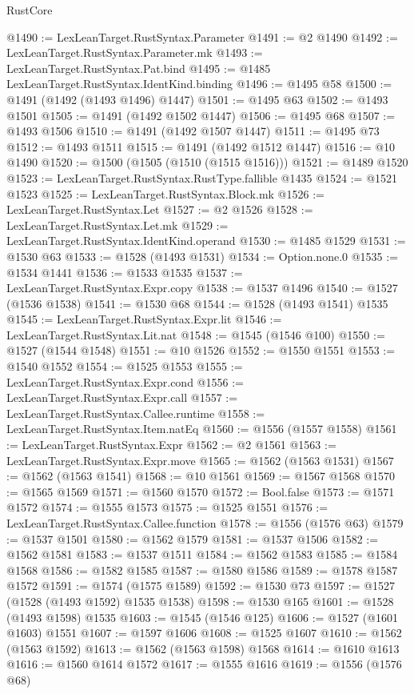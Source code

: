 \begin{lexlean}{RustCore}
\begin{coremodule}
@1490 := LexLeanTarget.RustSyntax.Parameter
@1491 := @2 @1490
@1492 := LexLeanTarget.RustSyntax.Parameter.mk
@1493 := LexLeanTarget.RustSyntax.Pat.bind
@1495 := @1485 LexLeanTarget.RustSyntax.IdentKind.binding
@1496 := @1495 @58
@1500 := @1491 (@1492 (@1493 @1496) @1447)
@1501 := @1495 @63
@1502 := @1493 @1501
@1505 := @1491 (@1492 @1502 @1447)
@1506 := @1495 @68
@1507 := @1493 @1506
@1510 := @1491 (@1492 @1507 @1447)
@1511 := @1495 @73
@1512 := @1493 @1511
@1515 := @1491 (@1492 @1512 @1447)
@1516 := @10 @1490
@1520 := @1500 (@1505 (@1510 (@1515 @1516)))
@1521 := @1489 @1520
@1523 := LexLeanTarget.RustSyntax.RustType.fallible @1435
@1524 := @1521 @1523
@1525 := LexLeanTarget.RustSyntax.Block.mk
@1526 := LexLeanTarget.RustSyntax.Let
@1527 := @2 @1526
@1528 := LexLeanTarget.RustSyntax.Let.mk
@1529 := LexLeanTarget.RustSyntax.IdentKind.operand
@1530 := @1485 @1529
@1531 := @1530 @63
@1533 := @1528 (@1493 @1531)
@1534 := Option.none.{0}
@1535 := @1534 @1441
@1536 := @1533 @1535
@1537 := LexLeanTarget.RustSyntax.Expr.copy
@1538 := @1537 @1496
@1540 := @1527 (@1536 @1538)
@1541 := @1530 @68
@1544 := @1528 (@1493 @1541) @1535
@1545 := LexLeanTarget.RustSyntax.Expr.lit
@1546 := LexLeanTarget.RustSyntax.Lit.nat
@1548 := @1545 (@1546 @100)
@1550 := @1527 (@1544 @1548)
@1551 := @10 @1526
@1552 := @1550 @1551
@1553 := @1540 @1552
@1554 := @1525 @1553
@1555 := LexLeanTarget.RustSyntax.Expr.cond
@1556 := LexLeanTarget.RustSyntax.Expr.call
@1557 := LexLeanTarget.RustSyntax.Callee.runtime
@1558 := LexLeanTarget.RustSyntax.Item.natEq
@1560 := @1556 (@1557 @1558)
@1561 := LexLeanTarget.RustSyntax.Expr
@1562 := @2 @1561
@1563 := LexLeanTarget.RustSyntax.Expr.move
@1565 := @1562 (@1563 @1531)
@1567 := @1562 (@1563 @1541)
@1568 := @10 @1561
@1569 := @1567 @1568
@1570 := @1565 @1569
@1571 := @1560 @1570
@1572 := Bool.false
@1573 := @1571 @1572
@1574 := @1555 @1573
@1575 := @1525 @1551
@1576 := LexLeanTarget.RustSyntax.Callee.function
@1578 := @1556 (@1576 @63)
@1579 := @1537 @1501
@1580 := @1562 @1579
@1581 := @1537 @1506
@1582 := @1562 @1581
@1583 := @1537 @1511
@1584 := @1562 @1583
@1585 := @1584 @1568
@1586 := @1582 @1585
@1587 := @1580 @1586
@1589 := @1578 @1587 @1572
@1591 := @1574 (@1575 @1589)
@1592 := @1530 @73
@1597 := @1527 (@1528 (@1493 @1592) @1535 @1538)
@1598 := @1530 @165
@1601 := @1528 (@1493 @1598) @1535
@1603 := @1545 (@1546 @125)
@1606 := @1527 (@1601 @1603) @1551
@1607 := @1597 @1606
@1608 := @1525 @1607
@1610 := @1562 (@1563 @1592)
@1613 := @1562 (@1563 @1598) @1568
@1614 := @1610 @1613
@1616 := @1560 @1614 @1572
@1617 := @1555 @1616
@1619 := @1556 (@1576 @68)

\end{coremodule}
\end{lexlean}
